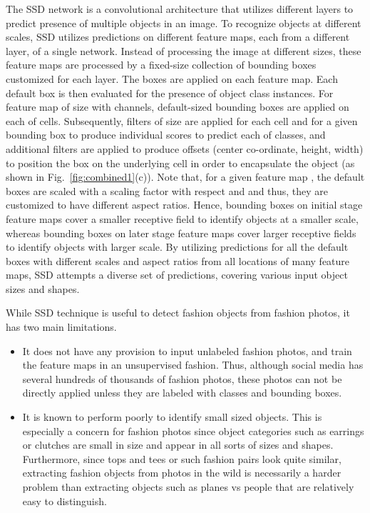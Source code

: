 \documentclass[sigconf]{acmart}
\begin{document}
The SSD network is a convolutional architecture 
that utilizes different layers to predict presence
of multiple objects in an image.
To recognize objects at different scales,
SSD utilizes predictions on different feature maps,
each from a different layer, of a single network.
Instead of processing the image at different sizes,
these feature maps are processed 
by a fixed-size collection of bounding boxes
customized for each layer.
The boxes are applied on each feature map.
Each default box is then evaluated for 
the presence of object class instances.
For feature map  of size  with  channels,
 default-sized bounding boxes are applied on each of  cells.
Subsequently,  filters of size  
are applied for each cell and for a given bounding box to produce individual scores
to predict each of  classes,
and  additional filters are applied to produce offsets
(center co-ordinate, height, width) to position the box
on the underlying cell in order to encapsulate the object
(as shown in Fig.~\ref{fig:combined1}(c)).
Note that, for a given feature map , 
the default boxes are scaled with a scaling factor
 with respect  and  and thus, they
are customized to have different aspect ratios.
Hence, bounding boxes on initial stage feature maps cover a smaller receptive field to identify
objects at a smaller scale, whereas bounding boxes on later stage feature maps
cover larger receptive fields to identify objects with larger scale.
By utilizing predictions 
for all the default boxes with different scales and aspect ratios
from all locations of many feature maps, 
SSD attempts a diverse set of predictions, covering
various input object sizes and shapes.

While SSD technique is useful to detect fashion objects from fashion photos,
it has two main limitations.
\begin{itemize}
\item It does not have any provision to input unlabeled fashion photos, and
train the feature maps in an unsupervised fashion. Thus, although social media
has several hundreds of thousands of fashion photos, these photos can not be
directly applied unless they are labeled with classes and bounding boxes. 
\item It is known to perform poorly to identify small sized objects.
This is especially a concern for fashion photos since object categories such
as earrings or clutches are small in size and appear in all sorts of sizes and shapes.
Furthermore, since tops and tees or such fashion pairs look quite similar,
extracting fashion objects from photos in the wild is necessarily a harder problem
than extracting objects such as planes vs people that are relatively easy to distinguish.
\end{itemize}
\end{document}

